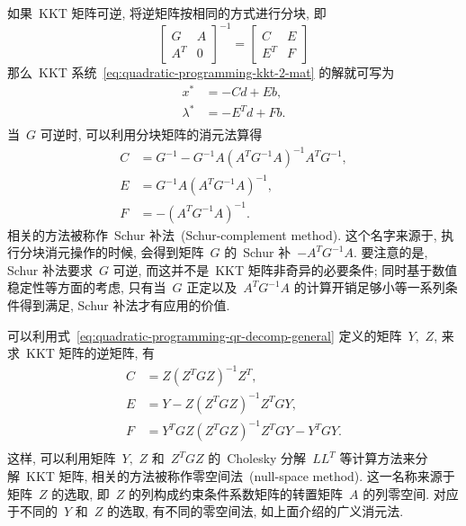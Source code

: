 \documentclass{SBCbookchapter}
\numberwithin{equation}{section}
\begin{document}
如果~KKT 矩阵可逆, 将逆矩阵按相同的方式进行分块, 即
\begin{equation}
\label{eq:quadratic-programming-kkt-inverse}
\begin{bmatrix} G & A \\ A^T & 0 \end{bmatrix}^{-1} = \begin{bmatrix} C & E \\ E^T & F \end{bmatrix}
\end{equation}
那么~KKT 系统~\eqref{eq:quadratic-programming-kkt-2-mat} 的解就可写为
\begin{equation}
\label{eq:quadratic-programming-kkt-sol-1}
\begin{aligned}
{x}^* & = - C {d} + E {b}, \\
{\lambda}^* & = - E^T {d} + F {b}. \\
\end{aligned}
\end{equation}
当~$G$ 可逆时, 可以利用分块矩阵的消元法算得
\begin{equation}
\label{eq:quadratic-programming-kkt-inv-1}
\begin{aligned}
C & = G^{-1} - G^{-1} A \left( A^TG^{-1}A \right)^{-1} A^T G^{-1},\\
E & = G^{-1} A \left( A^TG^{-1}A \right)^{-1},\\
F & = - \left( A^TG^{-1}A \right)^{-1}.
\end{aligned}
\end{equation}
相关的方法被称作~Schur 补法~(Schur-complement method). 这个名字来源于, 执行分块消元操作的时候, 会得到矩阵~$G$ 的~Schur 补~$-A^TG^{-1}A.$ 要注意的是, Schur 补法要求~$G$ 可逆, 而这并不是~KKT 矩阵非奇异的必要条件; 同时基于数值稳定性等方面的考虑, 只有当~$G$ 正定以及~$A^TG^{-1}A$ 的计算开销足够小等一系列条件得到满足, Schur 补法才有应用的价值.

可以利用式~\eqref{eq:quadratic-programming-qr-decomp-general} 定义的矩阵~$Y,$ $Z$, 来求~KKT 矩阵的逆矩阵, 有
\begin{equation}
\label{eq:quadratic-programming-kkt-inv-2}
\begin{aligned}
C & = Z \left( Z^T G Z \right)^{-1} Z^T,\\
E & = Y - Z \left( Z^T G Z \right)^{-1} Z^T G Y,\\
F & = Y^T G Z \left( Z^T G Z \right)^{-1} Z^T G Y - Y^T G Y.\\
\end{aligned}
\end{equation}
这样, 可以利用矩阵~$Y,$ $Z$ 和~$Z^T G Z$ 的~Cholesky 分解~$L L^T$ 等计算方法来分解~KKT 矩阵, 相关的方法被称作零空间法~(null-space method). 这一名称来源于矩阵~$Z$ 的选取, 即~$Z$ 的列构成约束条件系数矩阵的转置矩阵~$A$ 的列零空间. 对应于不同的~$Y$ 和~$Z$ 的选取, 有不同的零空间法, 如上面介绍的广义消元法.
\end{document}
